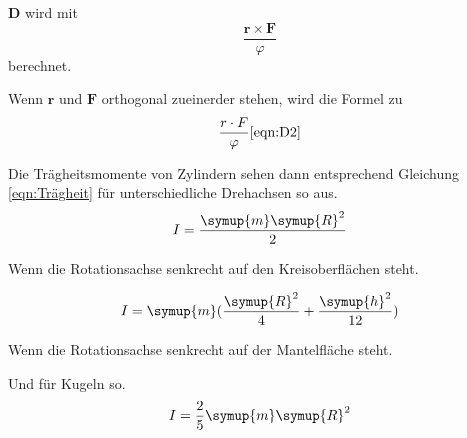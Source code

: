 $\symbf{D}$ wird mit
\begin{equation}
\frac{\symbf{r}\times \symbf{F}}{\varphi}
\label{eqn:D}
\end{equation}
berechnet.

Wenn $\symbf{r}$ und $\symbf{F}$ orthogonal zueinerder stehen, wird die Formel zu
\begin{equation}
    \frac{r \cdot F}{\varphi}
    \ref{eqn:D2}
\end{equation}

Die Trägheitsmomente von Zylindern sehen dann entsprechend Gleichung \ref{eqn:Trägheit} für unterschiedliche
Drehachsen so aus.
\begin{equation}
    I=\frac{\symup{m}\symup{R}^2}{2} 
    \label{eqn:Trägheit_Zyl_1} 
\end{equation}
    \begin{center} 
    Wenn die Rotationsachse senkrecht auf den Kreisoberflächen steht.
    \end{center}
\begin{equation}
    I=\symup{m} (\frac{\symup{R}^2}{4}+\frac{\symup{h}^2}{12}) 
    \label{eqn:Trägheit_Zyl_2}  
\end{equation}
\begin{center}   
    Wenn die Rotationsachse senkrecht auf der Mantelfläche steht.
\end{center}

Und für Kugeln so.
\begin{equation}
    I=\frac{2}{5}\symup{m}\symup{R}^2
    \label{eqn:Trägheit_Kugel}
\end{equation}
